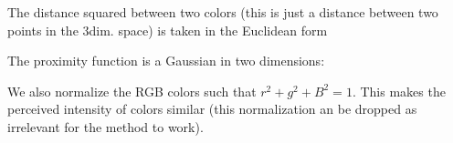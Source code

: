 \documentclass[letterpaper,10pt,english]{jupyterBook}
\begin{document}
\sphinxAtStartPar
The distance squared between two colors (this is just a distance between two points in the 3\sphinxhyphen{}dim. space) is taken in the Euclidean form

\begin{sphinxVerbatim}[commandchars=\\\{\}]
  
     \PYG{p}{[}\PYG{p}{]}\PYG{p}{[}\PYG{p}{]}\PYG{p}{[}\PYG{p}{]}\PYG{p}{[}\PYG{p}{]}\PYG{p}{[}\PYG{p}{]}\PYG{p}{[}\PYG{p}{]}
\end{sphinxVerbatim}

\sphinxAtStartPar
The proximity function is a Gaussian in two dimensions:

\begin{sphinxVerbatim}[commandchars=\\\{\}]
   
       
\end{sphinxVerbatim}

\sphinxAtStartPar
We also normalize the RGB colors such that \(r^2+g^2+B^2=1\). This makes the perceived intensity of colors similar (this normalization an be dropped as irrelevant for the method to work).
\end{document}
